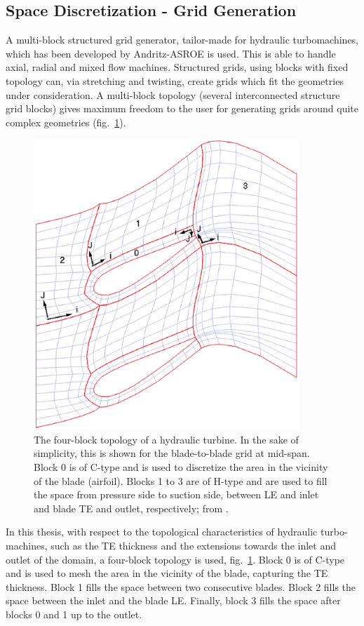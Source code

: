 \FloatBarrier
\subsection{Space Discretization - Grid Generation}
\label{SpaceDisct}
A multi-block structured grid generator, tailor-made for hydraulic turbomachines, which has been developed by Andritz-ASROE is used. This is able to handle axial, radial and mixed flow machines. Structured grids, using blocks with fixed topology can, via stretching and twisting, create grids which fit the geometries under consideration. A multi-block topology (several interconnected structure grid blocks) gives maximum freedom to the user for generating grids around quite complex geometries (fig.\ \ref{grid1}). 


\begin{figure}[h!]
\centering
\includegraphics[width=100mm]{cGridSkBlockIndex.eps} 
\caption{The four-block topology of a hydraulic turbine. In the sake of simplicity, this is shown for the blade-to-blade grid at mid-span. Block 0 is of C-type and is used to discretize the area in the vicinity of the blade (airfoil). Blocks 1 to 3 are of H-type and are used to fill the space from pressure side to suction side, between LE and inlet and  blade TE and outlet, respectively; from \cite{PaulSite}.}
\label{grid1}
\end{figure}


In this thesis, with respect to the topological characteristics of hydraulic turbo-machines, such as the TE thickness and the extensions towards the inlet and outlet of the domain, a four-block topology is used,  fig.\ \ref{grid1}. Block 0 is of C-type and is used to mesh the area in the vicinity of the blade, capturing the TE thickness. Block 1 fills the space between two consecutive blades. Block 2 fills the space between the inlet and the blade LE. Finally, block 3 fills the space after blocks 0 and 1 up to the outlet. 


